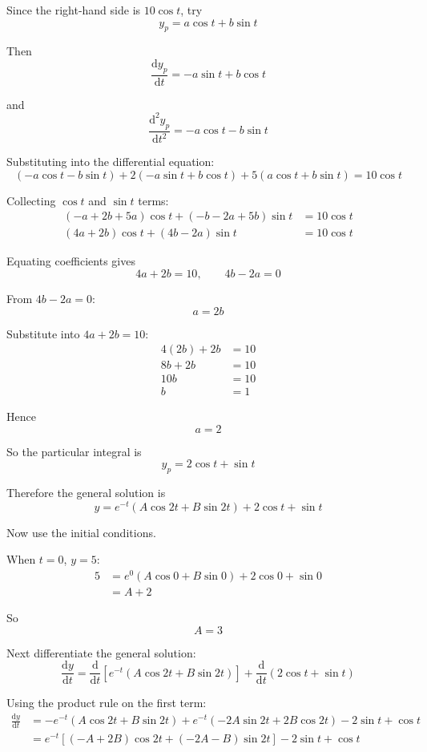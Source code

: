 \documentclass[leqno]{article}
\begin{document}
\begin{enumerate}[
  label=\textbf{\arabic*.},
  leftmargin=*,
  topsep=0pt,
  partopsep=0pt,
  parsep=0pt
]
\begin{djsSolution}
Since the right-hand side is $10\cos t$, try
\[
y_p=a\cos t+b\sin t
\]

Then
\[
\frac{\mathrm{d} y_p}{\mathrm{d} t}=-a\sin t+b\cos t
\]

and
\[
\frac{\mathrm{d}^2 y_p}{\mathrm{d} t^2}=-a\cos t-b\sin t
\]

Substituting into the differential equation:
\[
(-a\cos t-b\sin t)+2(-a\sin t+b\cos t)+5(a\cos t+b\sin t)=10\cos t
\]

Collecting $\cos t$ and $\sin t$ terms:
\begin{align*}
(-a+2b+5a)\cos t+(-b-2a+5b)\sin t &= 10\cos t \\
(4a+2b)\cos t+(4b-2a)\sin t &= 10\cos t
\end{align*}

Equating coefficients gives
\[
4a+2b=10,\qquad 4b-2a=0
\]

From $4b-2a=0$:
\[
a=2b
\]

Substitute into $4a+2b=10$:
\begin{align*}
4(2b)+2b &= 10 \\
8b+2b &= 10 \\
10b &= 10 \\
b &= 1
\end{align*}

Hence
\[
a=2
\]

So the particular integral is
\[
y_p=2\cos t+\sin t
\]

Therefore the general solution is
\[
y=e^{-t}(A\cos 2t+B\sin 2t)+2\cos t+\sin t
\]

Now use the initial conditions.

When $t=0$, $y=5$:
\begin{align*}
5 &= e^0(A\cos 0+B\sin 0)+2\cos 0+\sin 0 \\
  &= A+2
\end{align*}

So
\[
A=3
\]

Next differentiate the general solution:
\[
\frac{\mathrm{d} y}{\mathrm{d} t}
= \frac{\mathrm{d}}{\mathrm{d} t}\left[e^{-t}(A\cos 2t+B\sin 2t)\right]+\frac{\mathrm{d}}{\mathrm{d} t}(2\cos t+\sin t)
\]

Using the product rule on the first term:
\begin{align*}
\frac{\mathrm{d} y}{\mathrm{d} t}
&= -e^{-t}(A\cos 2t+B\sin 2t)
+e^{-t}(-2A\sin 2t+2B\cos 2t)
-2\sin t+\cos t \\
&= e^{-t}\left[(-A+2B)\cos 2t+(-2A-B)\sin 2t\right]-2\sin t+\cos t
\end{align*}


\end{djsSolution}
\end{enumerate}
\end{document}
